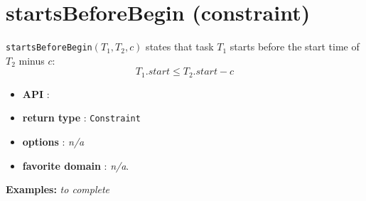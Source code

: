 \section{startsBeforeBegin (constraint)}\label{startsbeforebegin:startsbeforebeginconstraint}\hypertarget{startsbeforebegin:startsbeforebeginconstraint}{}
\begin{notedef}
\texttt{startsBeforeBegin}$(T_1,T_2,c)$  states that task $T_1$ starts before the start time of $T_2$ minus $c$:
  $$T_{1}.start \le T_{2}.start - c$$
\end{notedef}

\begin{itemize}
	\item \textbf{API} :
	\item \textbf{return type} : \texttt{Constraint}
	\item \textbf{options} : \emph{n/a}
	\item \textbf{favorite domain} : \emph{n/a}.
\end{itemize}

\textbf{Examples:}
%
\emph{to complete}
